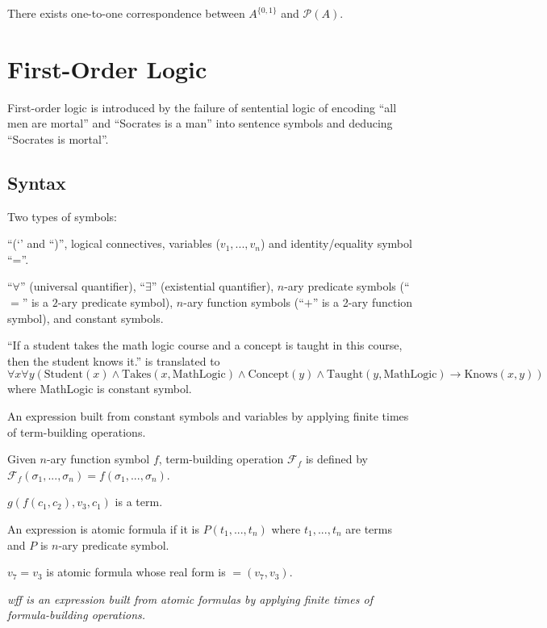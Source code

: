 \documentclass{article}
\newcommand \power[1]				{\mathcal{P}\left( #1 \right)}
\begin{document}
\eg There exists one-to-one correspondence between $A^{\{0,1\}}$ and $\power{A}$.



\section{First-Order Logic}

First-order logic is introduced by the failure of sentential logic of encoding ``all men are mortal'' and ``Socrates is a man'' into sentence symbols and deducing ``Socrates is mortal''.



\subsection{Syntax}

Two types of symbols: 

	``(`' and ``)'', logical connectives, variables ($v_1, ..., v_n$) and identity/equality symbol ``=''.
	
	``$\forall$'' (universal quantifier), ``$\exists$'' (existential quantifier), $n$-ary predicate symbols (\eg ``$=$'' is a $2$-ary predicate symbol), $n$-ary function symbols (\eg ``$+$'' is a 2-ary function symbol), and constant symbols.
	
\eg ``If a student takes the math logic course and a concept is taught in this course, then the student knows it.'' is translated to $\forall x \forall y (\text{Student}(x) \land \text{Takes}(x, \text{MathLogic}) \land \text{Concept}(y) \land \text{Taught}(y, \text{MathLogic}) \to \text{Knows}(x,y))$ where MathLogic is constant symbol.

	An expression built from constant symbols and variables by applying finite times of term-building operations.
	
	Given $n$-ary function symbol $f$, term-building operation $\mathcal{F}_f$ is defined by $\mathcal{F}_f(\sigma_1,...,\sigma_n) = f(\sigma_1,...,\sigma_n)$.

\eg $g(f(c_1,c_2),v_3,c_1)$ is a term.

	An expression is atomic formula if it is $P(t_1,...,t_n)$ where $t_1,...,t_n$ are terms and $P$ is $n$-ary predicate symbol.

	\eg $v_7=v_3$ is atomic formula whose real form is $=(v_7, v_3)$.

	\it{wff} is an expression built from atomic formulas by applying finite times of formula-building operations.
\end{document}
